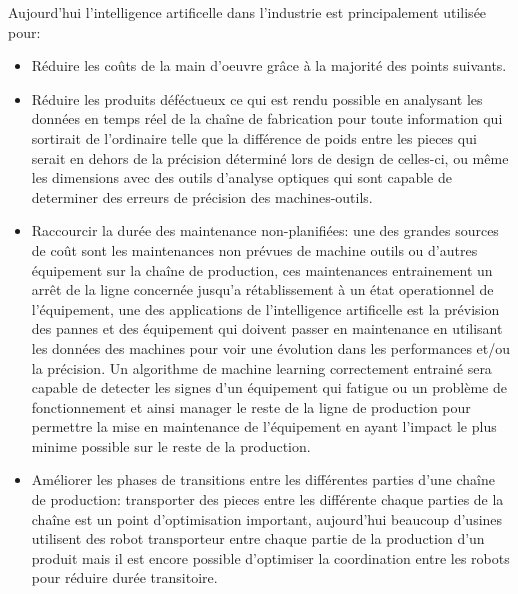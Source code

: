         Aujourd'hui l'intelligence artificelle dans l'industrie est principalement utilisée pour:
        \begin{itemize}
            \item Réduire les coûts de la main d'oeuvre grâce à la majorité des points suivants. \newline

            \item Réduire les produits déféctueux ce qui est rendu possible en analysant les données
            en temps réel de la chaîne de fabrication pour toute information qui sortirait de l'ordinaire 
            telle que la différence de poids entre les pieces qui serait en dehors de la précision déterminé
            lors de design de celles-ci, ou même les dimensions avec des outils d'analyse optiques qui 
            sont capable de determiner des erreurs de précision des machines-outils. \newline

            \item Raccourcir la durée des maintenance non-planifiées: une des grandes sources de coût sont les 
            maintenances non prévues de machine outils ou d'autres équipement sur la chaîne de production, ces
            maintenances entrainement un arrêt de la ligne concernée jusqu'a rétablissement à un état 
            operationnel de l'équipement, une des applications de l'intelligence artificelle est la 
            prévision des pannes et des équipement qui doivent passer en maintenance en utilisant les données
            des machines pour voir une évolution dans les performances et/ou la précision.
            Un algorithme de machine learning correctement entrainé sera capable de detecter les signes 
            d'un équipement qui fatigue ou un problème de fonctionnement et ainsi manager le reste 
            de la ligne de production pour permettre la mise en maintenance de l'équipement en ayant 
            l'impact le plus minime possible sur le reste de la production. \newline 

            \item Améliorer les phases de transitions entre les différentes parties d'une 
            chaîne de production: transporter des pieces entre les différente chaque parties 
            de la chaîne est un point d'optimisation important, aujourd'hui beaucoup d'usines
            utilisent des robot transporteur entre chaque partie de la production d'un produit
            mais il est encore possible d'optimiser la coordination entre les robots pour réduire
            durée transitoire. \newline 


\end{itemize}
